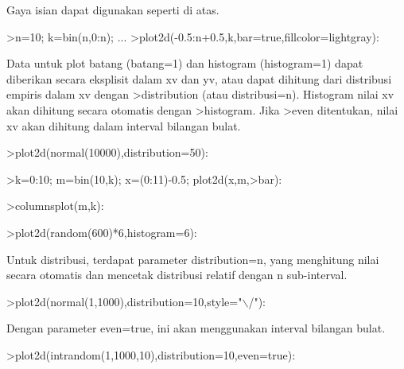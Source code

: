 \documentclass{article}
\begin{document}
\begin{eulernotebook}
\begin{eulercomment}
\begin{eulercomment}
\begin{eulercomment}
\begin{eulercomment}
\begin{eulercomment}
Gaya isian dapat digunakan seperti di atas.
\end{eulercomment}
\begin{eulerprompt}
>n=10; k=bin(n,0:n); ...
>plot2d(-0.5:n+0.5,k,bar=true,fillcolor=lightgray):
\end{eulerprompt}
\begin{eulercomment}
Data untuk plot batang (batang=1) dan histogram (histogram=1) dapat
diberikan secara eksplisit dalam xv dan yv, atau dapat dihitung dari
distribusi empiris dalam xv dengan \textgreater{}distribution (atau distribusi=n).
Histogram nilai xv akan dihitung secara otomatis dengan \textgreater{}histogram.
Jika \textgreater{}even ditentukan, nilai xv akan dihitung dalam interval bilangan
bulat.
\end{eulercomment}
\begin{eulerprompt}
>plot2d(normal(10000),distribution=50):
\end{eulerprompt}
\begin{eulerprompt}
>k=0:10; m=bin(10,k); x=(0:11)-0.5; plot2d(x,m,>bar):
\end{eulerprompt}
\begin{eulerprompt}
>columnsplot(m,k):
\end{eulerprompt}
\begin{eulerprompt}
>plot2d(random(600)*6,histogram=6):
\end{eulerprompt}
\begin{eulercomment}
Untuk distribusi, terdapat parameter distribution=n, yang menghitung
nilai secara otomatis dan mencetak distribusi relatif dengan n
sub-interval.
\end{eulercomment}
\begin{eulerprompt}
>plot2d(normal(1,1000),distribution=10,style="\(\backslash\)/"):
\end{eulerprompt}
\begin{eulercomment}
Dengan parameter even=true, ini akan menggunakan interval bilangan
bulat.
\end{eulercomment}
\begin{eulerprompt}
>plot2d(intrandom(1,1000,10),distribution=10,even=true):
\end{eulerprompt}

\end{eulercomment}
\end{eulercomment}
\end{eulercomment}
\end{eulercomment}
\end{eulernotebook}
\end{document}
